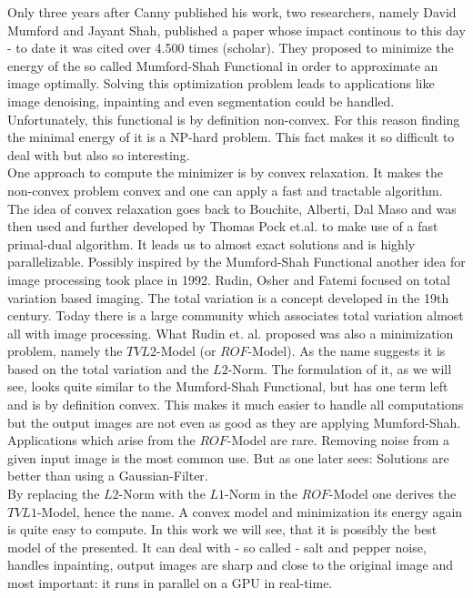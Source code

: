     Only three years after Canny published his work, two researchers, namely David Mumford and Jayant Shah, published a paper whose impact continous to this day - to date it was cited over 4.500 times (scholar). They proposed to minimize the energy of the so called Mumford-Shah Functional in order to approximate an image optimally. Solving this optimization problem leads to applications like image denoising, inpainting and even segmentation could be handled. Unfortunately, this functional is by definition non-convex. For this reason finding the minimal energy of it is a NP-hard problem. This fact makes it so difficult to deal with but also so interesting.\\
    One approach to compute the minimizer is by convex relaxation. It makes the non-convex problem convex and one can apply a fast and tractable algorithm. The idea of convex relaxation goes back to Bouchite, Alberti, Dal Maso and was then used and further developed by Thomas Pock et.al. to make use of a fast primal-dual algorithm. It leads us to almost exact solutions and is highly parallelizable. %
    Possibly inspired by the Mumford-Shah Functional another idea for image processing took place in 1992. Rudin, Osher and Fatemi focused on total variation based imaging. The total variation is a concept developed in the 19th century. Today there is a large community which associates total variation almost all with image processing. What Rudin et. al. proposed was also a minimization problem, namely the $TVL2$-Model (or $ROF$-Model). As the name suggests it is based on the total variation and the $L2$-Norm. The formulation of it, as we will see, looks quite similar to the Mumford-Shah Functional, but has one term left and is by definition convex. This makes it much easier to handle all computations but the output images are not even as good as they are applying Mumford-Shah. Applications which arise from the $ROF$-Model are rare. Removing noise from a given input image is the most common use. But as one later sees: Solutions are better than using a Gaussian-Filter.\\
    By replacing the $L2$-Norm with the $L1$-Norm in the $ROF$-Model one derives the $TVL1$-Model, hence the name. A convex model and minimization its energy again is quite easy to compute. In this work we will see, that it is possibly the best model of the presented. It can deal with - so called - salt and pepper noise, handles inpainting, output images are sharp and close to the original image and most important: it runs in parallel on a GPU in real-time.\\
